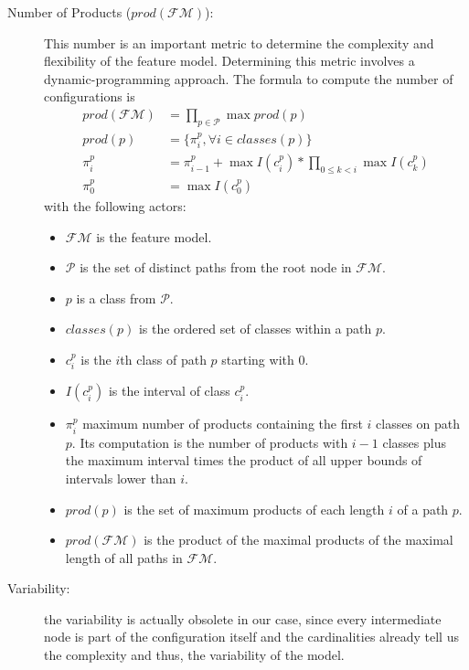 \begin{description}
 \item[Number of Products ($prod(\mathcal{FM})$):] This number is an important metric to determine the complexity and flexibility of the feature model. Determining this metric involves a dynamic-programming approach. The formula to compute the number of configurations is 
 \begin{align*}
   prod(\mathcal{FM}) &= \prod_{p \in \mathcal{P}}  \max prod(p)\\
   prod(p) &= \{ \pi_{i}^{p}, \forall i \in classes(p) \}\\
   \pi_{i}^{p} &= \pi_{i-1}^{p} + \max{I(c_{i}^{p})} *  \prod_{0 \leq k < i} \max{I(c_{k}^{p})}\\
   \pi_{0}^{p} &= \max{I(c_{0}^{p})} 
 \end{align*}
 with the following actors:
  \begin{itemize}
   \item $\mathcal{FM}$ is the feature model.
   \item $\mathcal{P}$ is the set of distinct paths from the root node in $\mathcal{FM}$.
   \item $p$ is a class from $\mathcal{P}$.
   \item $classes(p)$ is the ordered set of classes within a path $p$.
   \item $c_i^p$ is the $i$th class of path $p$ starting with 0.
   \item $I(c_i^p)$ is the interval of class $c_i^p$.
   \item $\pi_i^{p}$ maximum number of products containing the first $i$ classes on path $p$. Its computation is the number of products with $i-1$ classes plus the maximum interval times the product of all upper bounds of intervals lower than $i$.
   \item $prod(p)$ is the set of maximum products of each length $i$ of a path $p$.
   \item $prod(\mathcal{FM})$ is the product of the maximal products of the maximal length of all paths in $\mathcal{FM}$.
  \end{itemize}
 
 \item[Variability:] the variability is actually obsolete in our case, since every intermediate node is part of the configuration itself and the cardinalities already tell us the complexity and thus, the variability of the model. 
 

\end{description}
